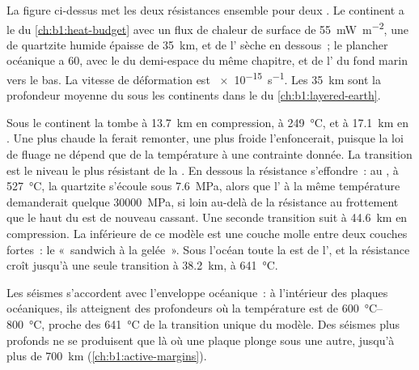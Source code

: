La figure ci-dessus met les deux résistances ensemble
pour deux . Le continent a le  du
\cref{ch:b1:heat-budget} avec un flux de chaleur de surface de \qty{55}{mW.m^{-2}}, une
 de quartzite humide épaisse de \qty{35}{km}, et de l' sèche en dessous~; le plancher
océanique a \qty{60}{\Ma}, avec le  du demi-espace du même chapitre,
et de l' du fond marin vers le bas. La vitesse de déformation est
\qty{e-15}{s^{-1}}. Les \qty{35}{km} sont la profondeur moyenne du  sous
les continents dans le  du \cref{ch:b1:layered-earth}.

Sous le continent la  tombe à \qty{13.7}{km}
en compression, à \qty{249}{\degreeCelsius}, et à \qty{17.1}{km} en
. Une  plus chaude la ferait remonter, une plus froide l'enfoncerait,
puisque la loi de fluage ne dépend que de la température à une contrainte donnée. La
transition est le niveau le plus résistant de la .
En dessous la résistance s'effondre~: au , à \qty{527}{\degreeCelsius},
la quartzite s'écoule sous \qty{7.6}{MPa}, alors que l' à la même température
demanderait quelque \qty{30000}{MPa}, si loin au-delà de la résistance au frottement que
le haut du  est de nouveau cassant. Une seconde transition suit à
\qty{44.6}{km} en compression. La  inférieure de ce modèle est une couche molle
entre deux couches fortes~: le «~sandwich à la gelée~». Sous l'océan toute la
 est de l', et la résistance croît jusqu'à une seule transition à
\qty{38.2}{km}, à \qty{641}{\degreeCelsius}.

Les séismes s'accordent avec l'enveloppe océanique~: à l'intérieur des plaques océaniques,
ils atteignent des profondeurs où la température est de
\qtyrange{600}{800}{\degreeCelsius}, proche des \qty{641}{\degreeCelsius}
de la transition unique du modèle. Des séismes plus profonds ne se produisent que là où une
plaque plonge sous une autre, jusqu'à plus de \qty{700}{km}
(\cref{ch:b1:active-margins}).

